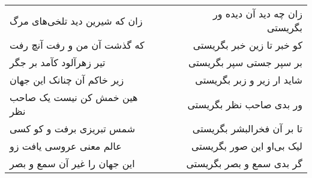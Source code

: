 \begin{center}
\begin{longtable}{l p{0.5cm} r}
\\
زان که شیرین دید تلخی‌های مرگ
&&
زان چه دید آن دیده ور بگریستی
\\
که گذشت آن من و رفت آنچ رفت
&&
کو خبر تا زین خبر بگریستی
\\
تیر زهرآلود کآمد بر جگر
&&
بر سپر جستی سپر بگریستی
\\
زیر خاکم آن چنانک این جهان
&&
شاید ار زیر و زبر بگریستی
\\
هین خمش کن نیست یک صاحب نظر
&&
ور بدی صاحب نظر بگریستی
\\
شمس تبریزی برفت و کو کسی
&&
تا بر آن فخرالبشر بگریستی
\\
عالم معنی عروسی یافت زو
&&
لیک بی‌او این صور بگریستی
\\
این جهان را غیر آن سمع و بصر
&&
گر بدی سمع و بصر بگریستی
\\
\end{longtable}
\end{center}
